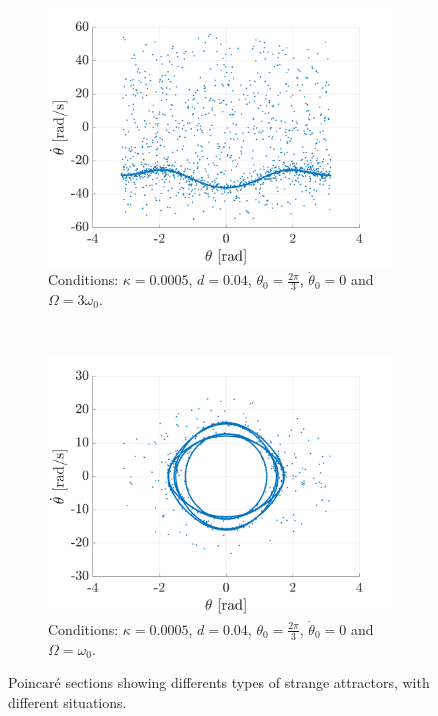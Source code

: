 \documentclass[a4paper,12pt,twoside]{article}
\begin{document}
\begin{figure}[h]
	~
	\begin{subfigure}[t]{0.48\textwidth}
		\includegraphics[width=\textwidth]{graphs/g_funfunfun_bernd.png}
		\caption{Conditions: $\kappa=0.0005$, $d=0.04$, $\theta_0=\frac{2\pi}{3}$, $\dot{\theta}_0=0$ and $\Omega=3\omega_0$.}
		\label{fig:g-funfunfun-bernd}
	\end{subfigure}
	~
	\begin{subfigure}[t]{0.48\textwidth}
		\includegraphics[width=\textwidth]{graphs/g_funfunfun_eye.png}
		\caption{Conditions: $\kappa=0.0005$, $d=0.04$, $\theta_0=\frac{2\pi}{3}$, $\dot{\theta}_0=0$ and $\Omega=\omega_0$.}
		\label{fig:g-funfunfun-eye}
	\end{subfigure}
	\caption{Poincaré sections showing differents types of strange attractors, with different situations.} %
	\label{fig:g-funfunfun}
\end{figure}
\end{document}
